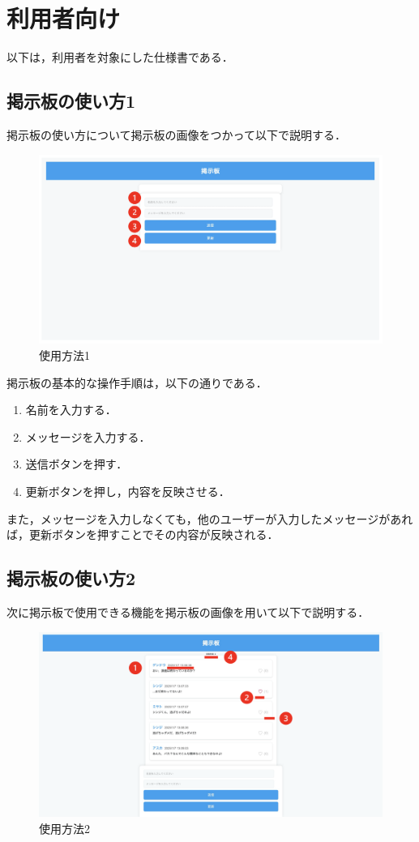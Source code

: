 \documentclass[uplatex,dvipdfmx]{jsarticle}
\begin{document}
\section{利用者向け}
以下は，利用者を対象にした仕様書である．
\clearpage
\subsection{掲示板の使い方1}
掲示板の使い方について掲示板の画像をつかって以下で説明する．
\begin{figure}[h]
    \centering
    \includegraphics[width=14cm]{使用者2.png}
    \caption{使用方法1}
    \label{fig:使用者1}
\end{figure}

掲示板の基本的な操作手順は，以下の通りである．
\begin{enumerate} 
    \item 名前を入力する．
    \item メッセージを入力する．
    \item 送信ボタンを押す．
    \item 更新ボタンを押し，内容を反映させる．
\end{enumerate} 
また，メッセージを入力しなくても，他のユーザーが入力したメッセージがあれば，更新ボタンを押すことでその内容が反映される．

\clearpage
\subsection{掲示板の使い方2}
次に掲示板で使用できる機能を掲示板の画像を用いて以下で説明する．

\begin{figure}[h]
    \centering
    \includegraphics[width=14cm]{使用者3.png}
    \caption{使用方法2}
    \label{fig:使用者2}
\end{figure}
\end{document}
